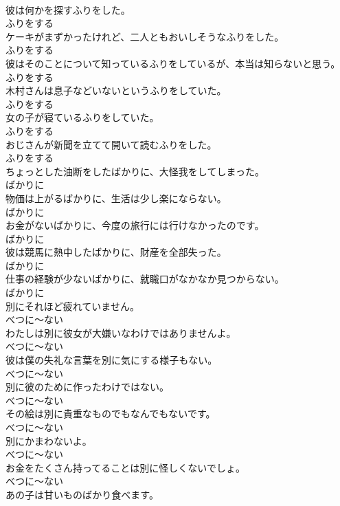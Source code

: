 \documentclass[8pt]{extreport}
\begin{document}
\begin{CJK}{UTF8}{min}
\\	彼は何かを探すふりをした。	
\\	ふりをする
\\	ケーキがまずかったけれど、二人ともおいしそうなふりをした。	
\\	ふりをする
\\	彼はそのことについて知っているふりをしているが、本当は知らないと思う。	
\\	ふりをする
\\	木村さんは息子などいないというふりをしていた。	
\\	ふりをする
\\	女の子が寝ているふりをしていた。	
\\	ふりをする
\\	おじさんが新聞を立てて開いて読むふりをした。	
\\	ふりをする
\\	ちょっとした油断をしたばかりに、大怪我をしてしまった。	
\\	ばかりに
\\	物価は上がるばかりに、生活は少し楽にならない。	
\\	ばかりに
\\	お金がないばかりに、今度の旅行には行けなかったのです。	
\\	ばかりに
\\	彼は競馬に熱中したばかりに、財産を全部失った。	
\\	ばかりに
\\	仕事の経験が少ないばかりに、就職口がなかなか見つからない。	
\\	ばかりに
\\	別にそれほど疲れていません。	
\\	べつに～ない
\\	わたしは別に彼女が大嫌いなわけではありませんよ。	
\\	べつに～ない
\\	彼は僕の失礼な言葉を別に気にする様子もない。	
\\	べつに～ない
\\	別に彼のために作ったわけではない。	
\\	べつに～ない
\\	その絵は別に貴重なものでもなんでもないです。	
\\	べつに～ない
\\	別にかまわないよ。	
\\	べつに～ない
\\	お金をたくさん持ってることは別に怪しくないでしょ。	
\\	べつに～ない
\\	あの子は甘いものばかり食べます。	

\end{CJK}
\end{document}
